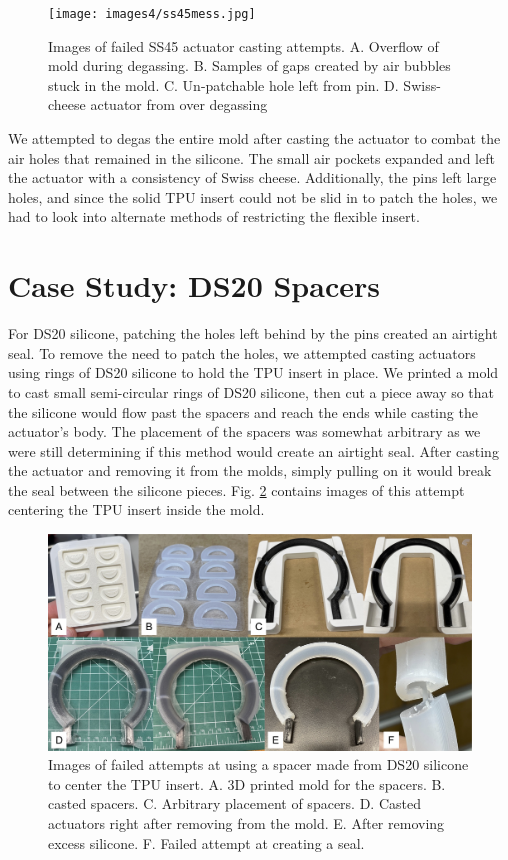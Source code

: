 \begin{figure}[h]
    \centering
    \texttt{[image: images4/ss45mess.jpg]}
    \caption{Images of failed SS45 actuator casting attempts. A. Overflow of mold during degassing. B. Samples of gaps created by air bubbles stuck in the mold. C. Un-patchable hole left from pin. D. Swiss-cheese actuator from over degassing}
    \label{fig:ss45mess}
\end{figure}

We attempted to degas the entire mold after casting the actuator to combat the air holes that remained in the silicone. The small air pockets expanded and left the actuator with a consistency of Swiss cheese. Additionally, the pins left large holes, and since the solid TPU insert could not be slid in to patch the holes, we had to look into alternate methods of restricting the flexible insert. 

\clearpage
\section{Case Study: DS20 Spacers}
For DS20 silicone, patching the holes left behind by the pins created an airtight seal. To remove the need to patch the holes, we attempted casting actuators using rings of DS20 silicone to hold the TPU insert in place. We printed a mold to cast small semi-circular rings of DS20 silicone, then cut a piece away so that the silicone would flow past the spacers and reach the ends while casting the actuator's body. The placement of the spacers was somewhat arbitrary as we were still determining if this method would create an airtight seal. After casting the actuator and removing it from the molds, simply pulling on it would break the seal between the silicone pieces. Fig. \ref{fig:ds20spacer} contains images of this attempt centering the TPU insert inside the mold. 

\begin{figure}[h]
    \centering
    \includegraphics[width=6 in]{images4/ds20spacer.jpg}
    \caption{Images of failed attempts at using a spacer made from DS20 silicone to center the TPU insert. A. 3D printed mold for the spacers. B. casted spacers. C. Arbitrary placement of spacers. D. Casted actuators right after removing from the mold. E. After removing excess silicone. F. Failed attempt at creating a seal.}
    \label{fig:ds20spacer}
\end{figure}

